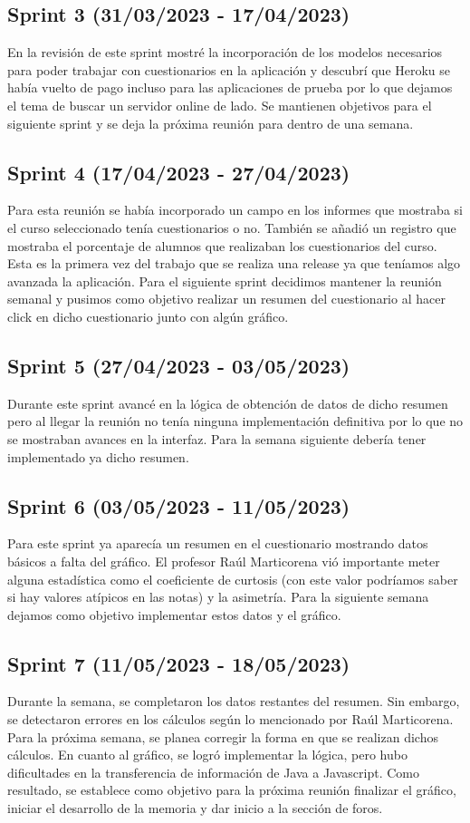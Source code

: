 \subsection{Sprint 3 (31/03/2023 - 17/04/2023)}
	En la revisión de este sprint mostré la incorporación de los modelos necesarios para poder trabajar con cuestionarios en la aplicación y descubrí que Heroku se había vuelto de pago incluso para las aplicaciones de prueba por lo que dejamos el tema de buscar un servidor online de lado. Se mantienen objetivos para el siguiente sprint y se deja la próxima reunión para dentro de una semana.

\subsection{Sprint 4 (17/04/2023 - 27/04/2023)}
	Para esta reunión se había incorporado un campo en los informes que mostraba si el curso seleccionado tenía cuestionarios o no. También se añadió un registro que mostraba el porcentaje de alumnos que realizaban los cuestionarios del curso. Esta es la primera vez del trabajo que se realiza una release ya que teníamos algo avanzada la aplicación. Para el siguiente sprint decidimos mantener la reunión semanal y pusimos como objetivo realizar un resumen del cuestionario al hacer click en dicho cuestionario junto con algún gráfico.

\subsection{Sprint 5 (27/04/2023 - 03/05/2023)}
	Durante este sprint avancé en la lógica de obtención de datos de dicho resumen pero al llegar la reunión no tenía ninguna implementación definitiva por lo que no se mostraban avances en la interfaz. Para la semana siguiente debería tener implementado ya dicho resumen.

\subsection{Sprint 6 (03/05/2023 - 11/05/2023)}
	Para este sprint ya aparecía un resumen en el cuestionario mostrando datos básicos a falta del gráfico. El profesor Raúl Marticorena vió importante meter alguna estadística como el coeficiente de curtosis (con este valor podríamos saber si hay valores atípicos en las notas) y la asimetría. Para la siguiente semana dejamos como objetivo implementar estos datos y el gráfico.

\subsection{Sprint 7 (11/05/2023 - 18/05/2023)}
	Durante la semana, se completaron los datos restantes del resumen. Sin embargo, se detectaron errores en los cálculos según lo mencionado por Raúl Marticorena. Para la próxima semana, se planea corregir la forma en que se realizan dichos cálculos. En cuanto al gráfico, se logró implementar la lógica, pero hubo dificultades en la transferencia de información de Java a Javascript. Como resultado, se establece como objetivo para la próxima reunión finalizar el gráfico, iniciar el desarrollo de la memoria y dar inicio a la sección de foros.

